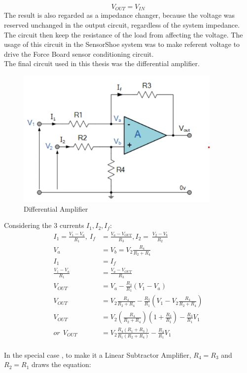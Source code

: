 \documentclass[12 pt, a4paper]{thesis}
\begin{document}
\begin{equation}
V_{OUT} = V_{IN}
\end{equation}
The result is also regarded as a impedance changer, because the voltage was reserved unchanged in the output circuit, regardless of the system impedance. The circuit then keep the resistance of the load from affecting the voltage. The usage of this circuit in the SensorShoe system was to make referent voltage to drive the Force Board sensor conditioning circuit.\\
The final circuit used in this thesis was the differential amplifier.\\
\begin{figure}
\centering
\includegraphics[width = 100mm]{OpAmp_5.png}
\caption{Differential Amplifier}
\end{figure}
Considering the 3 currents $I_1,I_2,I_f$:
\begin{equation}
\begin{split}
I_1 = \frac{V_1-V_a}{R_1},\:I_f &=\frac{V_a-V_{OUT}}{R_3},I_2=\:\frac{V_2-V_b}{R_2}\\
V_a &=V_b = V_2\frac{R_4}{R_2+R_4}\\
I_1 &=I_f\\
\frac{V_1-V_a}{R_1}&=\frac{V_a-V_{OUT}}{R_3}\\
V_{OUT}&=V_a-\frac{R_3}{R_1}(V_1-V_a)\\
V_{OUT}&=V_2\frac{R_4}{R_2+R_4}-\frac{R_3}{R_1}(V_1-V_2\frac{R_4}{R_2+R_4})\\
V_{OUT} &= V_2(\frac{R_4}{R_2+R_4})(1+\frac{R_3}{R_1})-\frac{R_3}{R_1}V_1\\
or\:\:V_{OUT} &= V_2\frac{R_4(R_1+R_3)}{R_1(R_2+R_4)}-\frac{R_3}{R_1}V_1
\end{split}
\end{equation}
\\In the special case , to make it a Linear Subtractor Amplifier, $R_4 = R_3$ and $R_2 = R_1$ draws the equation:
\end{document}
